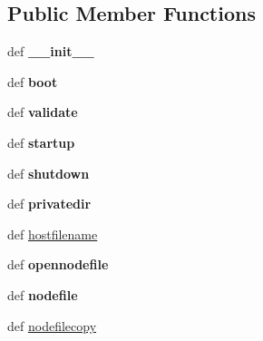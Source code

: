 \subsection*{Public Member Functions}
\begin{DoxyCompactItemize}
\item 
\hypertarget{classcore_1_1netns_1_1vnode_1_1_lxc_node_a525a55c987fde1ad74a24cdbf3fe7d85}{def {\bfseries \+\_\+\+\_\+init\+\_\+\+\_\+}}\label{classcore_1_1netns_1_1vnode_1_1_lxc_node_a525a55c987fde1ad74a24cdbf3fe7d85}

\item 
\hypertarget{classcore_1_1netns_1_1vnode_1_1_lxc_node_abb73285aca3d8d98ffde12bcd81473a4}{def {\bfseries boot}}\label{classcore_1_1netns_1_1vnode_1_1_lxc_node_abb73285aca3d8d98ffde12bcd81473a4}

\item 
\hypertarget{classcore_1_1netns_1_1vnode_1_1_lxc_node_ab321bab75d3a7171ca6281b91750826b}{def {\bfseries validate}}\label{classcore_1_1netns_1_1vnode_1_1_lxc_node_ab321bab75d3a7171ca6281b91750826b}

\item 
\hypertarget{classcore_1_1netns_1_1vnode_1_1_lxc_node_a4fb9f21bfc3d2abc1c90a871cb3c4c65}{def {\bfseries startup}}\label{classcore_1_1netns_1_1vnode_1_1_lxc_node_a4fb9f21bfc3d2abc1c90a871cb3c4c65}

\item 
\hypertarget{classcore_1_1netns_1_1vnode_1_1_lxc_node_a0f3813d3b09c02591d37e7ac74ee6488}{def {\bfseries shutdown}}\label{classcore_1_1netns_1_1vnode_1_1_lxc_node_a0f3813d3b09c02591d37e7ac74ee6488}

\item 
\hypertarget{classcore_1_1netns_1_1vnode_1_1_lxc_node_ace67581de0266564f7cd41109fb9a784}{def {\bfseries privatedir}}\label{classcore_1_1netns_1_1vnode_1_1_lxc_node_ace67581de0266564f7cd41109fb9a784}

\item 
def \hyperlink{classcore_1_1netns_1_1vnode_1_1_lxc_node_a06aff36ee4930e99a2451e7c6d49b0bf}{hostfilename}
\item 
\hypertarget{classcore_1_1netns_1_1vnode_1_1_lxc_node_a4ba4f53bd176b2ce2499c0dc0a903dc0}{def {\bfseries opennodefile}}\label{classcore_1_1netns_1_1vnode_1_1_lxc_node_a4ba4f53bd176b2ce2499c0dc0a903dc0}

\item 
\hypertarget{classcore_1_1netns_1_1vnode_1_1_lxc_node_a053cc4d3df1baa3a3ee8648c36a528ef}{def {\bfseries nodefile}}\label{classcore_1_1netns_1_1vnode_1_1_lxc_node_a053cc4d3df1baa3a3ee8648c36a528ef}

\item 
def \hyperlink{classcore_1_1netns_1_1vnode_1_1_lxc_node_a3519e45d1bcde42af6b3c0b00968bfd9}{nodefilecopy}
\end{DoxyCompactItemize}
